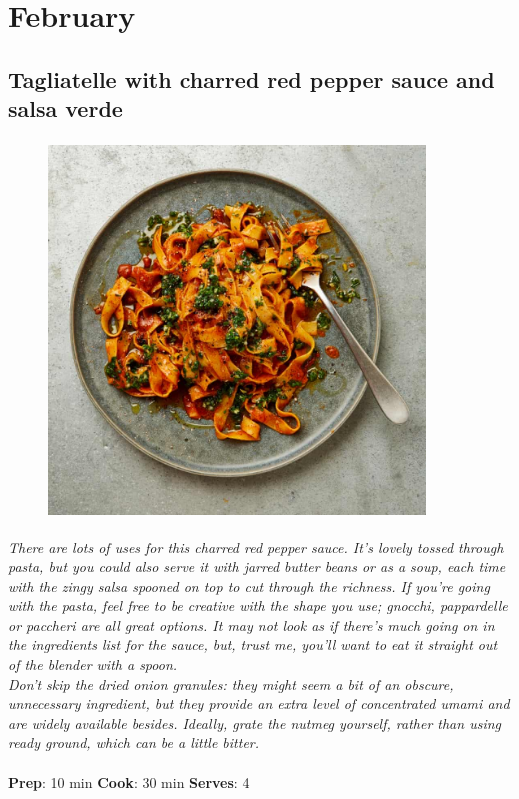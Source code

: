 \documentclass{book}
\begin{document}
\chapter{February}
\section{Tagliatelle with charred red pepper sauce and salsa verde}
\begin{figure}
\centering\includegraphics[width=10cm,height=10cm,keepaspectratio]{Recipe_Pictures/Tagliatelle_with_charred_red_pepper_sauce_and_salsa_verde.png}
\end{figure}
\emph{There are lots of uses for this charred red pepper sauce. It’s lovely tossed through pasta, but you could also serve it with jarred butter beans or as a soup, each time with the zingy salsa spooned on top to cut through the richness. If you’re going with the pasta, feel free to be creative with the shape you use; gnocchi, pappardelle or paccheri are all great options. It may not look as if there’s much going on in the ingredients list for the sauce, but, trust me, you’ll want to eat it straight out of the blender with a spoon.\\ 
Don’t skip the dried onion granules: they might seem a bit of an obscure, unnecessary ingredient, but they provide an extra level of concentrated umami and are widely available besides. Ideally, grate the nutmeg yourself, rather than using ready ground, which can be a little bitter.}\\\\ 
\textbf{Prep}: 10 min
\textbf{Cook}: 30 min
\textbf{Serves}: 4
\end{document}
